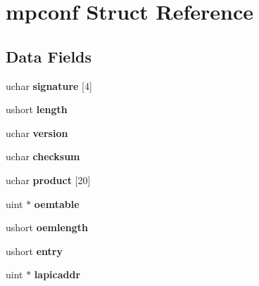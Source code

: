 \hypertarget{structmpconf}{}\section{mpconf Struct Reference}
\label{structmpconf}
\subsection*{Data Fields}
\begin{DoxyCompactItemize}
\item 
uchar {\bfseries signature} \mbox{[}4\mbox{]}\hypertarget{structmpconf_a7bf26b6b2b09d4265ffcbdb362bc5c8b}{}\label{structmpconf_a7bf26b6b2b09d4265ffcbdb362bc5c8b}

\item 
ushort {\bfseries length}\hypertarget{structmpconf_a6b7583180c78b6a2e490d6c72779d8dd}{}\label{structmpconf_a6b7583180c78b6a2e490d6c72779d8dd}

\item 
uchar {\bfseries version}\hypertarget{structmpconf_ade1055584605c76f4e1134d6631e0afa}{}\label{structmpconf_ade1055584605c76f4e1134d6631e0afa}

\item 
uchar {\bfseries checksum}\hypertarget{structmpconf_aac54c4c7710b90574416a945cdcd3b9e}{}\label{structmpconf_aac54c4c7710b90574416a945cdcd3b9e}

\item 
uchar {\bfseries product} \mbox{[}20\mbox{]}\hypertarget{structmpconf_ac4e4d4d150aac8ea0bba92ff2cfae557}{}\label{structmpconf_ac4e4d4d150aac8ea0bba92ff2cfae557}

\item 
uint $\ast$ {\bfseries oemtable}\hypertarget{structmpconf_a1b3e44d3639e8f3117e6bca9626d680b}{}\label{structmpconf_a1b3e44d3639e8f3117e6bca9626d680b}

\item 
ushort {\bfseries oemlength}\hypertarget{structmpconf_a5aaf9c7afa2f1be645b8e633f6ff43a1}{}\label{structmpconf_a5aaf9c7afa2f1be645b8e633f6ff43a1}

\item 
ushort {\bfseries entry}\hypertarget{structmpconf_a75f67295a180d1f72b93be82e09ecc2a}{}\label{structmpconf_a75f67295a180d1f72b93be82e09ecc2a}

\item 
uint $\ast$ {\bfseries lapicaddr}\hypertarget{structmpconf_a087fac7e9dc4ca1fdfe142b3adf96c99}{}\label{structmpconf_a087fac7e9dc4ca1fdfe142b3adf96c99}


\end{DoxyCompactItemize}

